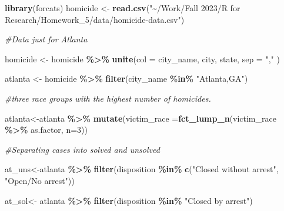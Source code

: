 \documentclass[
]{article}
\newenvironment{Shaded}{\begin{snugshade}}{\end{snugshade}}
\newcommand{\AttributeTok}[1]{\textcolor[rgb]{0.13,0.29,0.53}{#1}}
\newcommand{\CommentTok}[1]{\textcolor[rgb]{0.56,0.35,0.01}{\textit{#1}}}
\newcommand{\DecValTok}[1]{\textcolor[rgb]{0.00,0.00,0.81}{#1}}
\newcommand{\FunctionTok}[1]{\textcolor[rgb]{0.13,0.29,0.53}{\textbf{#1}}}
\newcommand{\NormalTok}[1]{#1}
\newcommand{\OtherTok}[1]{\textcolor[rgb]{0.56,0.35,0.01}{#1}}
\newcommand{\SpecialCharTok}[1]{\textcolor[rgb]{0.81,0.36,0.00}{\textbf{#1}}}
\newcommand{\StringTok}[1]{\textcolor[rgb]{0.31,0.60,0.02}{#1}}
\begin{document}
\begin{Shaded}
\begin{Highlighting}[]
\FunctionTok{library}\NormalTok{(forcats)}
\NormalTok{homicide }\OtherTok{\textless{}{-}} \FunctionTok{read.csv}\NormalTok{(}\StringTok{"\textasciitilde{}/Work/Fall 2023/R for Research/Homework\_5/data/homicide{-}data.csv"}\NormalTok{)}
\end{Highlighting}
\end{Shaded}

\begin{Shaded}
\begin{Highlighting}[]
\CommentTok{\#Data just for Atlanta }

\NormalTok{homicide }\OtherTok{\textless{}{-}}\NormalTok{ homicide }\SpecialCharTok{\%\textgreater{}\%} 
  \FunctionTok{unite}\NormalTok{(}\AttributeTok{col =}\NormalTok{ city\_name, city, state, }\AttributeTok{sep =} \StringTok{","}\NormalTok{ )}

\NormalTok{atlanta }\OtherTok{\textless{}{-}}\NormalTok{ homicide }\SpecialCharTok{\%\textgreater{}\%} 
  \FunctionTok{filter}\NormalTok{(city\_name }\SpecialCharTok{\%in\%} \StringTok{"Atlanta,GA"}\NormalTok{)}

\CommentTok{\#three race groups with the highest number of homicides.}

\NormalTok{atlanta}\OtherTok{\textless{}{-}}\NormalTok{atlanta }\SpecialCharTok{\%\textgreater{}\%} 
  \FunctionTok{mutate}\NormalTok{(}\AttributeTok{victim\_race =}\FunctionTok{fct\_lump\_n}\NormalTok{(victim\_race }\SpecialCharTok{\%\textgreater{}\%}\NormalTok{ as.factor, }\AttributeTok{n=}\DecValTok{3}\NormalTok{))}
\end{Highlighting}
\end{Shaded}

\begin{Shaded}
\begin{Highlighting}[]
\CommentTok{\#Separating cases into solved and unsolved }

\NormalTok{at\_uns}\OtherTok{\textless{}{-}}\NormalTok{atlanta }\SpecialCharTok{\%\textgreater{}\%} 
  \FunctionTok{filter}\NormalTok{(disposition }\SpecialCharTok{\%in\%} \FunctionTok{c}\NormalTok{(}\StringTok{"Closed without arrest"}\NormalTok{, }\StringTok{"Open/No arrest"}\NormalTok{))}

\NormalTok{at\_sol}\OtherTok{\textless{}{-}}\NormalTok{ atlanta }\SpecialCharTok{\%\textgreater{}\%} 
  \FunctionTok{filter}\NormalTok{(disposition }\SpecialCharTok{\%in\%} \StringTok{"Closed by arrest"}\NormalTok{)}
\end{Highlighting}
\end{Shaded}
\end{document}
